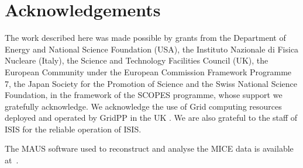 \section{Acknowledgements}
\label{Sect:Acknowledgements}

The work described here was made possible by grants from the Department of Energy and National Science Foundation (USA), the Instituto Nazionale di Fisica Nucleare (Italy), 
the Science and Technology Facilities Council (UK), the European Community under the European Commission Framework Programme 7, the Japan Society for the Promotion of 
Science and the Swiss National Science Foundation, in the framework of the SCOPES programme, whose support we gratefully acknowledge. We acknowledge the use of Grid 
computing resources deployed and operated by GridPP in the UK \cite{grid_pp_2009}. We are also grateful to the staff of ISIS for the reliable operation of ISIS.

The MAUS software used to reconstruct and analyse the MICE data is available at~\cite{MICE_code}.
